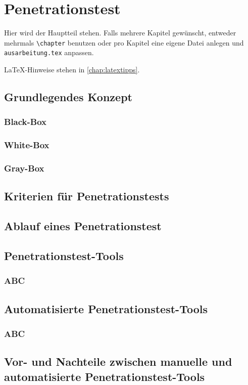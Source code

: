 \chapter{Penetrationstest}
\label{chap:k4}

Hier wird der Hauptteil stehen. Falls mehrere Kapitel gewünscht, entweder mehrmals \texttt{\textbackslash{}chapter} benutzen oder pro Kapitel eine eigene Datei anlegen und \texttt{ausarbeitung.tex} anpassen.

LaTeX-Hinweise stehen in \cref{chap:latextipps}.

\section{Grundlegendes Konzept}

\subsection{Black-Box}

\subsection{White-Box}

\subsection{Gray-Box}

\section{Kriterien für Penetrationstests}

\section{Ablauf eines Penetrationstest}

\section{Penetrationstest-Tools}

\subsection{ABC}

\section{Automatisierte Penetrationstest-Tools}

\subsection{ABC}

\section{Vor- und Nachteile zwischen manuelle und automatisierte Penetrationstest-Tools}